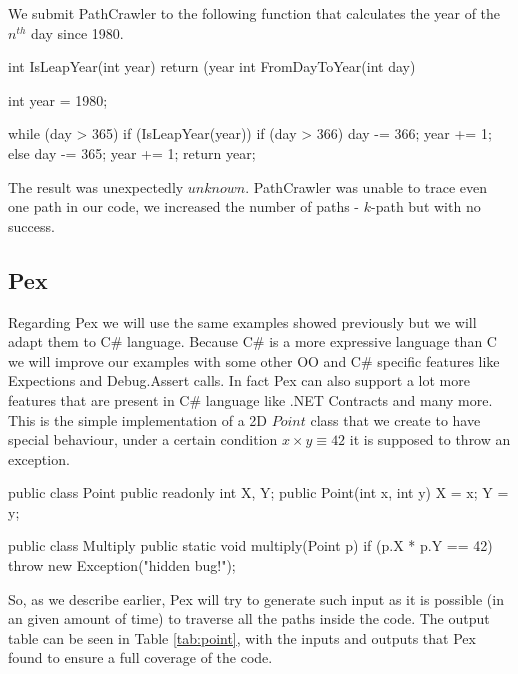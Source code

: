\documentclass[10pt, conference, compsocconf]{IEEEtran}
\begin{document}
We submit PathCrawler to the following function that calculates the year of the $n^{th}$ day since 1980.

\begin{code}
int IsLeapYear(int year) {
  return (year %
}
int FromDayToYear(int day) {
  int year = 1980;

  while (day > 365) {
    if (IsLeapYear(year)) {
      if (day > 366) {
        day -= 366;
        year += 1;
      }
    } else {
      day -= 365;
      year += 1;
    }
  }
  return year;
}
\end{code}

The result was unexpectedly $unknown$. PathCrawler was unable to trace even one path in our code, we increased the number of paths - $k$-path but with no success.

\subsection{Pex}
Regarding Pex we will use the same examples showed previously but we will adapt them to C\# language.
Because C\# is a more expressive language than C we will improve our examples with some other OO and C\# specific features like Expections and Debug.Assert calls.
In fact Pex can also support a lot more features that are present in C\# language like .NET Contracts and many more.\\
This is the simple implementation of a 2D $Point$ class that we create to have special behaviour, under a certain condition
$x \times y \equiv 42$ it is supposed to throw an exception.

\begin{code}
public class Point {
  public readonly int X, Y;
  public Point(int x, int y) { X = x; Y = y; }
}

public class Multiply {
  public static void multiply(Point p) {
    if (p.X * p.Y == 42)
        throw new Exception("hidden bug!");
  }
}
\end{code}

So, as we describe earlier, Pex will try to generate such input as it is possible (in an given amount of time) to traverse all the paths inside the code.
The output table can be seen in Table \ref{tab:point}, with the inputs and outputs that Pex found to ensure a full coverage of the code.
\end{document}
